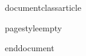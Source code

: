 
documentclass{article}
\usepackage[margin=1pt]{geometry}
\usepackage{tikz}
pagestyle{empty}

end{document}
